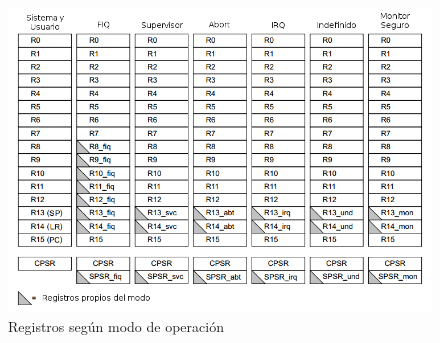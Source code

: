 \begin{figure}[h]
  \centering
    \includegraphics[width=14cm]{graphs/tablaregistros.png}
  \caption{Registros según modo de operación}
  \label{fig:tablareg}
\end{figure}

